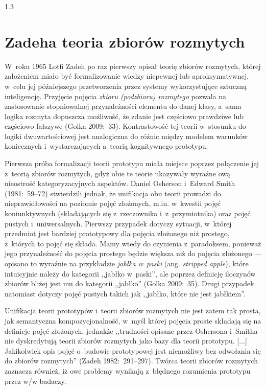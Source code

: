 \documentclass[11pt,a4paper,twoside]{report}
\begin{document}
\begin{spacing}{1.3}
\vspace*{0.5\baselineskip}
\section{Zadeha teoria zbiorów rozmytych}

W~roku 1965 Lotfi Zadeh po raz pierwszy opisał teorię zbiorów rozmytych, której założeniem miało być formalizowanie wiedzy niepewnej lub aproksymatywnej, w~celu jej późniejszego przetworzenia przez systemy wykorzystujące sztuczną inteligencję. Przyjęcie pojęcia \emph{zbioru (podzbioru) rozmytego} pozwala na zastosowanie stopniowalnej przynależności elementu do danej klasy, a~sama logika rozmyta dopuszcza możliwość, że zdanie jest częściowo prawdziwe lub częściowo fałszywe (Golka 2009:~33). Kontrastowość tej teorii w~stosunku do logiki dwuwartościowej jest analogiczna do różnic między modelem warunków koniecznych i~wystarczających a~teorią kognitywnego prototypu.

Pierwsza próba formalizacji teorii prototypu miała miejsce poprzez połączenie jej z~teorią zbiorów rozmytych, gdyż obie te teorie ukazywały wyraźne ową nieostrość kategoryzacyjnych aspektów. Daniel Osherson i~Edward Smith (1981:~59--72) stwierdzili jednak, że unifikacja obu teorii prowadzi do nieprawidłowości na poziomie pojęć złożonych, m.in. w~kwestii pojęć koniunktywnych (składających się z~rzeczownika i~z~przymiotnika) oraz pojęć pustych i~uniwersalnych. Pierwszy przypadek dotyczy sytuacji, w~której przedmiot jest bardziej prototypowy dla pojęcia złożonego niż prostego, z~których to pojęć się składa. Mamy wtedy do czynienia z~paradoksem, ponieważ jego przynależność do pojęcia prostego będzie większa niż do pojęcia złożonego --- opisano to wyraźnie na przykładzie \emph{jabłka w~paski} (ang. \emph{stripped apple}), które intuicyjnie należy do kategorii ,,jabłko w~paski'', ale poprzez definicję iloczynów zbiorów bliżej jest mu do kategorii ,,jabłko'' (Golka 2009:~35). Drugi przypadek natomiast dotyczy pojęć pustych takich jak ,,jabłko, które nie jest jabłkiem''.

Unifikacja teorii prototypów i~teorii zbiorów rozmytych nie jest zatem tak prosta, jak semantyczna kompozycjonalność, w~myśl której pojęcia proste składają się na definicje pojęć złożonych, jednakże ,,trudności opisane przez Oshersona i~Smitha nie dyskredytują teorii zbiorów rozmytych jako bazy dla teorii prototypu. [...] Jakikolwiek opis pojęć o~budowie prototypowej jest niemożliwy bez odwołania się do zbiorów rozmytych'' (Zadeh 1982:~291--297). Twórca teorii zbiorów rozmytych zaznacza również, iż owe problemy wynikają z~błędnego rozumienia prototypu przez w/w badaczy.

\end{spacing}
\end{document}
